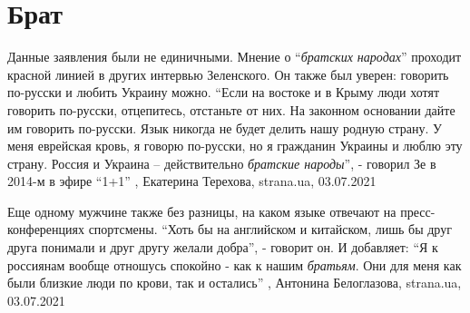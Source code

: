  
 
 
 
 
\chapter{Брат}

Данные заявления были не единичными. Мнение о \enquote{\emph{братских народах}} проходит
красной линией в других интервью Зеленского. Он также был уверен: говорить
по-русски и любить Украину можно. 
\enquote{Если на востоке и в Крыму люди хотят говорить по-русски, отцепитесь, отстаньте
от них. На законном основании дайте им говорить по-русски. Язык никогда не
будет делить нашу родную страну. У меня еврейская кровь, я говорю по-русски, но
я гражданин Украины и люблю эту страну. Россия и Украина – действительно
\emph{братские народы}}, - говорил Зе в 2014-м в эфире \enquote{1+1}
, 
Екатерина Терехова, strana.ua, 03.07.2021

Еще одному мужчине также без разницы, на каком языке отвечают на
пресс-конференциях спортсмены.  \enquote{Хоть бы на английском и китайском, лишь бы
друг друга понимали и друг другу желали добра}, - говорит он.  И добавляет: \enquote{Я
к россиянам вообще отношусь спокойно - как к нашим \emph{братьям}. Они для меня как
были близкие люди по крови, так и остались}
, 
Антонина Белоглазова, strana.ua, 03.07.2021

